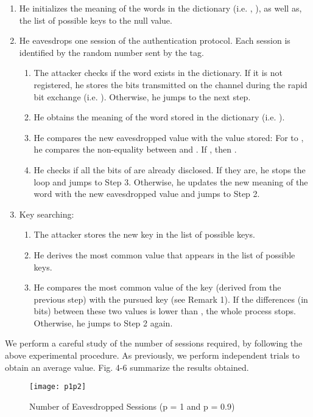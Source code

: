 \documentclass{article}
\begin{document}
\begin{enumerate}
  \item  He initializes the meaning of the words in the dictionary (i.e.  , ), as well as, the list of possible keys to the null value. \item  He eavesdrops one session of the authentication protocol. Each session is identified by the random number  sent by the tag.
      \begin{enumerate}
      \item The attacker checks if the word exists in the dictionary. If it is not registered, he stores the bits transmitted on the channel during the rapid bit exchange (i.e. ). Otherwise, he jumps to the next step.
      \item He obtains the meaning of the word  stored in the dictionary (i.e. ).
      \item He compares the new eavesdropped value with the value stored: For  to , he compares the non-equality between  and . If , then .
      \item He checks if all the bits of  are already disclosed. If they are, he stops the loop and jumps to Step 3. Otherwise, he updates the new meaning of the word with the new  eavesdropped value and jumps to Step 2.
             \end{enumerate}
   \item Key searching:
   \begin{enumerate}
     \item The attacker stores the new key in the list of possible keys.
     \item He derives the most common value that appears in the list of possible keys. \item He compares the most common value of the key (derived from the previous step) with the pursued key (see Remark 1). If the differences (in bits) between these two values is lower than , the whole process stops. Otherwise, he jumps to Step 2 again.
    \end{enumerate}
\end{enumerate}

We perform a careful study of the number of sessions required, by following the above experimental procedure.
As previously,  we perform   independent trials to obtain an average value. Fig. 4-6 summarize the results obtained.

\begin{figure}
\centering
\texttt{[image: p1p2]}\\
  \caption{Number of Eavesdropped Sessions (p = 1 and p = 0.9)}\label{fig::fig4}
\end{figure}
\end{document}
